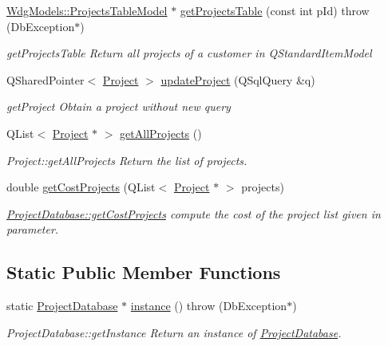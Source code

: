 \begin{DoxyCompactItemize}
\hyperlink{classGui_1_1Widgets_1_1WdgModels_1_1ProjectsTableModel}{Wdg\-Models\-::\-Projects\-Table\-Model} $\ast$ \hyperlink{classDatabases_1_1ProjectDatabase_ac00628f2d8911298dcb0292f6c4cff66}{get\-Projects\-Table} (const int p\-Id)  throw (\-Db\-Exception$\ast$)
\begin{DoxyCompactList}\small\item\em get\-Projects\-Table Return all projects of a customer in Q\-Standard\-Item\-Model \end{DoxyCompactList}\item 
Q\-Shared\-Pointer$<$ \hyperlink{classModels_1_1Project}{Project} $>$ \hyperlink{classDatabases_1_1ProjectDatabase_ab644aeb47d9666e8191cc9bc6ab93417}{update\-Project} (Q\-Sql\-Query \&q)
\begin{DoxyCompactList}\small\item\em get\-Project Obtain a project without new query \end{DoxyCompactList}\item 
Q\-List$<$ \hyperlink{classModels_1_1Project}{Project} $\ast$ $>$ \hyperlink{classDatabases_1_1ProjectDatabase_ac2532676aabcc8f304b2a3ddf4892205}{get\-All\-Projects} ()
\begin{DoxyCompactList}\small\item\em Project\-::get\-All\-Projects Return the list of projects. \end{DoxyCompactList}\item 
double \hyperlink{classDatabases_1_1ProjectDatabase_a5629637e3611002aa024c4a275239cae}{get\-Cost\-Projects} (Q\-List$<$ \hyperlink{classModels_1_1Project}{Project} $\ast$ $>$ projects)
\begin{DoxyCompactList}\small\item\em \hyperlink{classDatabases_1_1ProjectDatabase_a5629637e3611002aa024c4a275239cae}{Project\-Database\-::get\-Cost\-Projects} compute the cost of the project list given in parameter. \end{DoxyCompactList}\end{DoxyCompactItemize}
\subsection*{Static Public Member Functions}
\begin{DoxyCompactItemize}
\item 
static \hyperlink{classDatabases_1_1ProjectDatabase}{Project\-Database} $\ast$ \hyperlink{classDatabases_1_1ProjectDatabase_a75cf81b8d073addcf43a313483dafe65}{instance} ()  throw (\-Db\-Exception$\ast$)
\begin{DoxyCompactList}\small\item\em Project\-Database\-::get\-Instance Return an instance of \hyperlink{classDatabases_1_1ProjectDatabase}{Project\-Database}. \end{DoxyCompactList}\end{DoxyCompactItemize}
